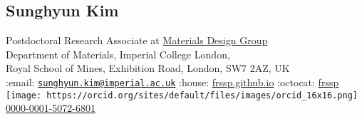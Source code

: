 \hypertarget{sunghyun-kim}{%
\subsection{Sunghyun Kim}\label{sunghyun-kim}}

Postdoctoral Research Associate at
\href{https://wmd-group.github.io}{Materials Design Group}\\
Department of Materials, Imperial College London,\\
Royal School of Mines, Exhibition Road, London, SW7 2AZ, UK\\
:email:
\href{mailto:sunghyun.kim@imperial.ac.uk}{\nolinkurl{sunghyun.kim@imperial.ac.uk}}
\textbar{} :house: \href{https://frssp.github.io}{frssp.github.io}
\textbar{} :octocat: \href{https://github.com/frssp}{frssp} \textbar{}
\texttt{[image: https://orcid.org/sites/default/files/images/orcid\_16x16.png]}
\href{https://orcid.org/0000-0001-5072-6801}{0000-0001-5072-6801}
